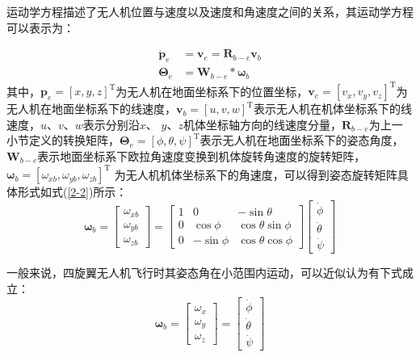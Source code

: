 \documentclass[lang=chs, degree=master, blindreview=false, winfonts=true]{yanputhesis}
\begin{document}
运动学方程描述了无人机位置与速度以及速度和角速度之间的关系，其运动学方程可以表示为：

\begin{equation}
    \begin{aligned}
	\dot{\boldsymbol{p}}_e &= \boldsymbol{v}_e = \bm{R}_{b-e} \bm{v}_b \\
	\bm{\Theta}_e &= \bm{W}_{b-e} * \bm{\omega}_b
\end{aligned}\label{2-1}
\end{equation}
其中，$\boldsymbol{p}_e=\left[x,y,z\right]^\mathrm{T}$为无人机在地面坐标系下的位置坐标，$\boldsymbol{v}_e=\left[v_{x},v_{y},v_{z}\right]^\mathrm{T}$为无人机在地面坐标系下的线速度，$\boldsymbol{v}_b=\left[u,v,w\right]^\mathrm{T}$表示无人机在机体坐标系下的线速度，$u$、$v$、$w$表示分别沿$x$、
$y$、$z$机体坐标轴方向的线速度分量，$\boldsymbol{R}_{b-e}$为上一小节定义的转换矩阵，$\bm{\Theta}_e=\left[\phi,\theta,\psi\right]^\mathrm{T}$表示无人机在地面坐标系下的姿态角度，$\bm{W}_{b-e}$表示地面坐标系下欧拉角速度变换到机体旋转角速度的旋转矩阵，$\boldsymbol{\omega}_b=\left[{\omega}_{xb},{\omega}_{yb},{\omega}_{zb}\right]^\mathrm{T}$ 为无人机机体坐标系下的角速度，可以得到姿态旋转矩阵具体形式如式(\ref{2-2})所示：
\begin{equation}
	\boldsymbol{\omega}_b=\begin{bmatrix}\omega_{xb}\\\omega_{yb}\\\omega_{zb}\end{bmatrix}=\begin{bmatrix}1&0&-\sin\theta\\0&\cos\phi&\cos\theta\sin\phi\\0&-\sin\phi&\cos\theta\cos\phi\end{bmatrix}\begin{bmatrix}\dot\phi\\\dot\theta\\\dot\psi\end{bmatrix}
	\label{2-2}
\end{equation}



一般来说，四旋翼无人机飞行时其姿态角在小范围内运动，可以近似认为有下式成立：
\begin{equation}
	\boldsymbol{\omega}_b=\begin{bmatrix}{\omega}_x\\{\omega}_y\\{\omega}_z\end{bmatrix}=\begin{bmatrix}\dot{\phi}\\\dot{\theta}\\\dot{\psi}\end{bmatrix}
	\label{2-3}
\end{equation}
\end{document}
